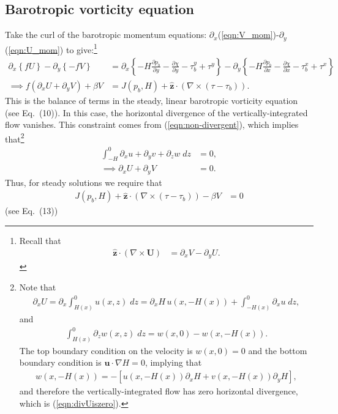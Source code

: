 \documentclass[10pt]{amsart}
\begin{document}
\subsection{Barotropic vorticity equation}
\label{sect:BVE}
Take the curl of the barotropic momentum equations: $\partial_x$(\ref{eqn:V_mom})-$\partial_y$(\ref{eqn:U_mom}) to give:\footnote{
Recall that 
\begin{align}
{\hat{\mathbf z}} \cdot \left( \nabla \times {\mathbf U} \right) & = \partial_x V - \partial_y U .
\end{align}
}
 \begin{align}
\partial_x \left\{ f  U \right\} - \partial_y \left\{ - f V \right\} & =  
\partial_x \left\{ - H \frac{\partial p_b}{\partial y} - \frac{\partial \chi }{\partial y}  - \tau^y_b + \tau^y \right\} -
\partial_y \left\{ - H \frac{\partial p_b}{\partial x} - \frac{\partial \chi}{\partial x}  - \tau^x_b + \tau^x \right\} \nonumber \\
\implies
f \left( \partial_x   U + \partial_y V \right) + \beta V & =  J(p_b, H) + \hat{\mathbf{z}} \cdot \left( \nabla \times \left( \tau - \tau_b \right) \right) .
\label{eqn:BVE}
\end{align}
This is the balance of terms in the steady, linear barotropic vorticity equation (see \citealt{waldman&giordani23} Eq.~(10)).
In this case, the horizontal divergence of the vertically-integrated flow vanishes.
This constraint comes from (\ref{eqn:non-divergent}), which implies that\footnote{
Note that 
\begin{align}
\partial_x U = \partial_x \int_{H(x)}^0 u(x, z) \; dz = \partial_x H\, u(x,-H(x)) + \int_{-H(x)}^0 \partial_x u \; dz , \nonumber
\end{align}
and 
\begin{align}
 \int_{H(x)}^0 \partial_z w(x, z) \; dz = w(x,0) - w(x, -H(x))  .\nonumber
\end{align}
The top boundary condition on the velocity is $w(x,0)=0$ and the bottom boundary condition is $\mathbf{u} \cdot \nabla H = 0$, implying that
\begin{align}
w(x,-H(x)) = -\left[ u(x,-H(x)) \partial_x H + v(x,-H(x)) \partial_y H \right] \nonumber ,
\end{align}
and therefore the vertically-integrated flow has zero horizontal divergence, which is (\ref{eqn:divUiszero}).
}
\begin{align}
\int_{-H}^0 \partial_x u + \partial_y v + \partial_z w \; dz &= 0 , \nonumber \\
\implies \partial_x U + \partial_y V & = 0 .
\label{eqn:divUiszero}
\end{align}
Thus, for steady solutions we require that
 \begin{align}
 J(p_b, H) + \hat{\mathbf{z}} \cdot \left( \nabla \times \left( \tau - \tau_b \right) \right) -  \beta V & = 0
 \label{eqn:BVE_constraint}
\end{align}
(see \citealt{nost&isachsen03} Eq.~(13))
\end{document}
